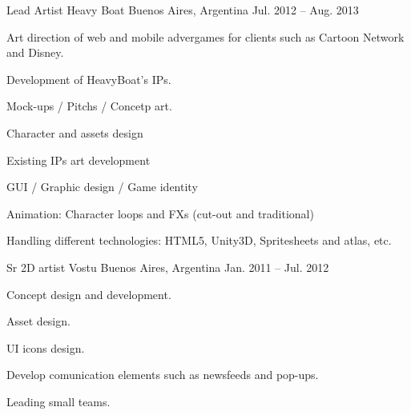 \begin{cventries}
  \cventry
    {Lead Artist} %
    {Heavy Boat} %
    {Buenos Aires, Argentina} %
    {Jul. 2012 – Aug. 2013} %
    {
      \begin{cvitems} %
       \item {Art direction of web and mobile advergames for clients such as Cartoon Network and Disney.}
       \item {Development of HeavyBoat's IPs.}
       \item {Mock-ups / Pitchs / Concetp art.}
       \item {Character and assets design}
       \item {Existing IPs art development}
       \item {GUI / Graphic design / Game identity}
       \item {Animation: Character loops and FXs (cut-out and traditional)}
       \item {Handling different technologies: HTML5, Unity3D, Spritesheets and atlas, etc.}
      \end{cvitems}
    }
  \cventry
    {Sr 2D artist} %
    {Vostu} %
    {Buenos Aires, Argentina} %
    {Jan. 2011 – Jul. 2012 } %
    {
      \begin{cvitems} %
        \item {Concept design and development.}
        \item {Asset design.}
        \item {UI icons design.}
        \item {Develop comunication elements such as newsfeeds and pop-ups.}
        \item {Leading small teams.}
      \end{cvitems}
    }


\end{cventries}
